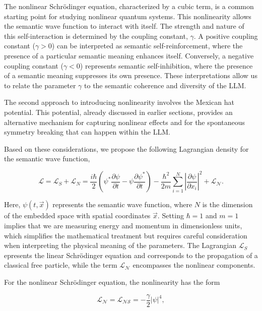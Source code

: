 \documentclass[prd,amsmath,amssymb,12pt]{revtex4}
\begin{document}
The nonlinear Schrödinger equation, characterized by a cubic term, is a common starting point for
studying nonlinear quantum systems. This nonlinearity allows the semantic wave function to interact with itself.
The strength and nature of this self-interaction is determined by the coupling constant, $\gamma$. A positive
coupling constant ($\gamma > 0$) can be interpreted as semantic self-reinforcement, where the presence of a
particular semantic meaning enhances itself. Conversely, a negative coupling constant ($\gamma < 0$) represents
semantic self-inhibition, where the presence of a semantic meaning suppresses its own presence. These
interpretations allow us to relate the parameter $\gamma$ to the semantic coherence and diversity of the LLM.

The second approach to introducing nonlinearity involves the Mexican hat potential. This potential, already
discussed in earlier sections, provides an alternative mechanism for capturing nonlinear effects and for the
spontaneous symmetry breaking that can happen within the LLM.

Based on these considerations, we propose the following Lagrangian density for the semantic wave function,

\begin{equation}
    \mathcal{L} =
    \mathcal{L}_S +\mathcal{L}_N
    =\frac{i\hbar}{2}\left(\psi^*\frac{\partial \psi}{\partial t}-\psi\frac{\partial \psi^*}{\partial t}\right)
    -\frac{\hbar^2}{2m}\sum_{i=1}^{N} \left |\frac{\partial \psi}{\partial x_i} \right |^2
    +\mathcal{L_{N}}.
\end{equation}

\noindent
Here, $\psi(t, \vec{x})$ represents the semantic wave function,
where $N$ is the dimension of the embedded space with spatial coordinates $\vec{x}$. Setting $\hbar = 1$
and $m = 1$ implies that we are measuring energy and momentum in dimensionless units, which simplifies the
mathematical treatment but requires careful consideration when interpreting the physical meaning of the parameters.
The Lagrangian $\mathcal{L}_S $ epresents the linear Schrödinger equation and corresponds to the propagation
of a classical free particle, while the term $\mathcal{L_{N}}$ encompasses the nonlinear components.

For the nonlinear Schrödinger equation, the nonlinearity has the form

\begin{equation}
    \mathcal{L_{N}} = \mathcal{L_{NS}} =
    -\frac{\gamma}{2}|\psi|^4,
\end{equation}
\end{document}
